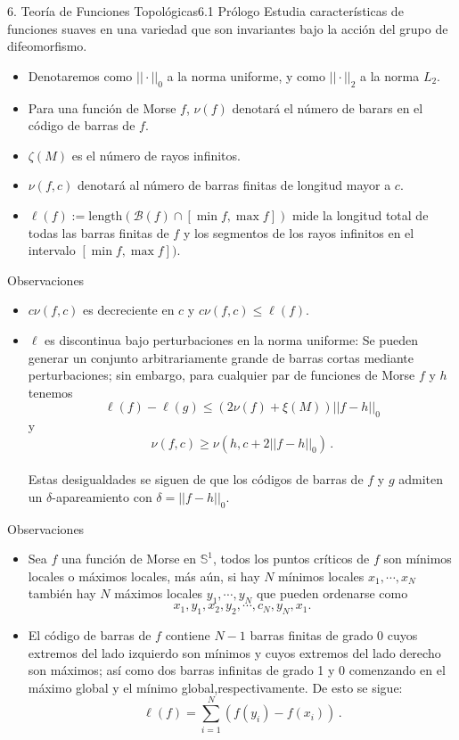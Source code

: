 \documentclass{beamer}
\begin{document}
\begin{frame}{6. Teor\'ia de Funciones Topol\'ogicas}{6.1 Pr\'ologo}
Estudia características de funciones suaves en una variedad que son invariantes bajo la acción del grupo de difeomorfismo.\\
\vspace{1em}
\begin{itemize}
\item Denotaremos como $||\cdot ||_0$ a la norma uniforme, y como $||\cdot ||_2$ a la norma $L_2$.
\item Para una funci\'on de Morse $f$, $\nu(f)$ denotar\'a el n\'umero de barars en el c\'odigo de barras de $f$.
\item $\zeta(M)$ es el n\'umero de rayos infinitos.
\item $\nu(f,c)$ denotar\'a al n\'umero de barras finitas de longitud mayor a $c$.
\item $\ell (f):=\mbox{length}(\mathcal{B}(f) \cap [\min f,\max f])$ mide la longitud total de todas las barras finitas de $f$ y los segmentos de los rayos infinitos en el intervalo $[\min f,\max f])$.
\end{itemize}
\end{frame}


\begin{frame}{Observaciones}
\begin{itemize}
\item $c\nu(f,c)$ es decreciente en $c$ y $c\nu(f,c)\leq \ell (f)$.
\item $\ell $ es discontinua bajo perturbaciones en la norma uniforme: Se pueden generar un conjunto arbitrariamente grande de barras cortas mediante perturbaciones; sin embargo, para cualquier par de funciones de Morse $f$ y $h$ tenemos
$$\ell(f)-\ell(g)\leq (2\nu(f)+\xi(M))||f-h||_0$$ y $$\nu(f,c)\geq \nu(h,c+2||f-h||_{0})\,.$$\\
Estas desigualdades se siguen de que los c\'odigos de barras de $f$ y $g$ admiten un $\delta$-apareamiento con $\delta=||f-h||_0$.
\end{itemize}
\end{frame}

\begin{frame}{Observaciones}
\begin{itemize}
\item Sea $f$ una funci\'on de Morse en $\mathbb{S}^1$, todos los puntos cr\'iticos de $f$ son m\'inimos locales o m\'aximos locales, m\'as a\'un, si hay $N$ m\'inimos locales $x_{1},\cdots,x_{N}$ tambi\'en hay $N$ m\'aximos locales $y_1,\cdots,y_N$ que pueden ordenarse como $$x_1,y_1,x_2,y_2,\cdots,c_N,y_N,x_1.$$
\item El c\'odigo de barras de $f$ contiene $N-1$ barras finitas de grado 0 cuyos extremos del lado izquierdo son m\'inimos y cuyos extremos del lado derecho son m\'aximos; as\'i como dos barras infinitas de grado 1 y 0 comenzando en el m\'aximo global y el m\'inimo global,respectivamente. De esto se sigue: $$\ell(f)=\sum_{i=1}^{N}(f(y_i)-f(x_i))\,.$$
\end{itemize}
\end{frame}
\end{document}
